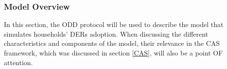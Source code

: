 \subsubsection{Model Overview} \label{overview}
In this section, the ODD protocol will be used to describe the model that simulates households' DERs adoption. When discussing the different characteristics and components of the model, their relevance in the CAS framework, which was discussed in section \ref{CAS}, will also be a point OF attention.
\begin{itemize}
\end{itemize}

